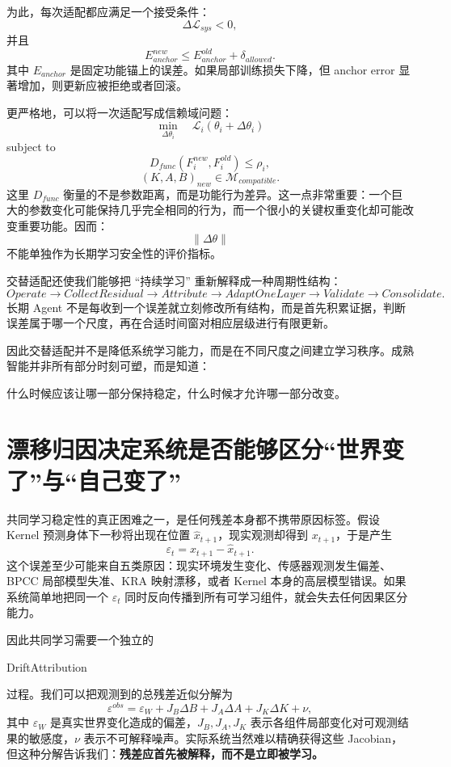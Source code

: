 为此，每次适配都应满足一个接受条件：
\[
\Delta \mathcal L_{sys}<0,
\]
并且
\[
E_{anchor}^{new}
\leq
E_{anchor}^{old}
+
\delta_{allowed}.
\]
其中 $E_{anchor}$ 是固定功能锚上的误差。如果局部训练损失下降，但 anchor error 显著增加，则更新应被拒绝或者回滚。

更严格地，可以将一次适配写成信赖域问题：
\[
\min_{\Delta\theta_i}
\quad
\mathcal L_i(\theta_i+\Delta\theta_i)
\]
subject to
\[
D_{func}
\left(
F_i^{new},
F_i^{old}
\right)
\leq
\rho_i,
\]
\[
(K,A,B)_{new}
\in
\mathcal M_{compatible}.
\]
这里 $D_{func}$ 衡量的不是参数距离，而是功能行为差异。这一点非常重要：一个巨大的参数变化可能保持几乎完全相同的行为，而一个很小的关键权重变化却可能改变重要功能。因而：
\[
\|\Delta\theta\|
\]
不能单独作为长期学习安全性的评价指标。

交替适配还使我们能够把 ``持续学习'' 重新解释成一种周期性结构：
\[
Operate
\rightarrow
CollectResidual
\rightarrow
Attribute
\rightarrow
AdaptOneLayer
\rightarrow
Validate
\rightarrow
Consolidate.
\]
长期 Agent 不是每收到一个误差就立刻修改所有结构，而是首先积累证据，判断误差属于哪一个尺度，再在合适时间窗对相应层级进行有限更新。

因此交替适配并不是降低系统学习能力，而是在不同尺度之间建立学习秩序。成熟智能并非所有部分时刻可塑，而是知道：
\begin{statementbox}
什么时候应该让哪一部分保持稳定，什么时候才允许哪一部分改变。
\end{statementbox}

\section{漂移归因决定系统是否能够区分“世界变了”与“自己变了”}

共同学习稳定性的真正困难之一，是任何残差本身都不携带原因标签。假设 Kernel 预测身体下一秒将出现在位置 $\hat x_{t+1}$，现实观测却得到 $x_{t+1}$，于是产生
\[
\varepsilon_t
=
x_{t+1}-\hat x_{t+1}.
\]
这个误差至少可能来自五类原因：现实环境发生变化、传感器观测发生偏差、BPCC 局部模型失准、KRA 映射漂移，或者 Kernel 本身的高层模型错误。如果系统简单地把同一个 $\varepsilon_t$ 同时反向传播到所有可学习组件，就会失去任何因果区分能力。

因此共同学习需要一个独立的
\begin{statementbox}
DriftAttribution
\end{statementbox}
过程。我们可以把观测到的总残差近似分解为
\[
\varepsilon^{obs}
=
\varepsilon_W
+
J_B\Delta B
+
J_A\Delta A
+
J_K\Delta K
+
\nu,
\]
其中 $\varepsilon_W$ 是真实世界变化造成的偏差，$J_B,J_A,J_K$ 表示各组件局部变化对可观测结果的敏感度，$\nu$ 表示不可解释噪声。实际系统当然难以精确获得这些 Jacobian，但这种分解告诉我们：\textbf{残差应首先被解释，而不是立即被学习。}

